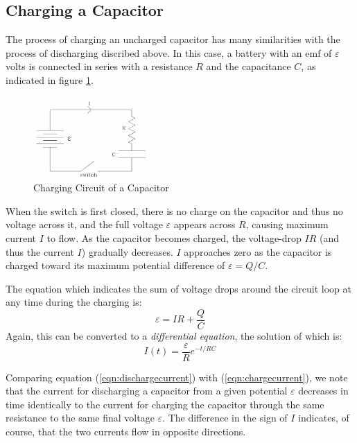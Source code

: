\subsection{Charging a Capacitor}

The process of charging an uncharged capacitor has many similarities with the process of discharging discribed above. In this case, a battery with an emf of $\varepsilon$ volts is connected in series with a resistance $R$ and the capacitance $C$, as indicated in figure \ref{fig:chargecircuit}.

\begin{figure}[h]
    \begin{center}
        \includegraphics[width=0.4\textwidth]{./Exp3/pic/image3.png}
    \end{center}
    \caption{Charging Circuit of a Capacitor}
    \label{fig:chargecircuit}
\end{figure}

When the switch is first closed, there is no charge on the capacitor and thus no voltage across it, and the full voltage $\varepsilon$ appears across $R$, causing maximum current $I$ to flow. As the capacitor becomes charged, the voltage-drop $IR$ (and thus the current $I$) gradually decreases. $I$ approaches zero as the capacitor is charged toward its maximum potential difference of $\varepsilon = Q/C$. \myskip

The equation which indicates the sum of voltage drops around the circuit loop at any time during the charging is:
\begin{equation}
    \varepsilon = IR + \frac{Q}{C}
\end{equation}
Again, this can be converted to a \emph{differential equation}, the solution of which is:
\begin{equation}
    I(t) = \frac{\varepsilon}{R}e^{-t/RC}
    \label{eqn:chargecurrent}
\end{equation}

Comparing equation (\ref{eqn:dischargecurrent}) with (\ref{eqn:chargecurrent}), we note that the current for discharging a capacitor from a given potential $\varepsilon$ decreases in time identically to the current for charging the capacitor through the same resistance to the same final voltage $\varepsilon$. The difference in the sign of $I$ indicates, of course, that the two currents flow in opposite directions.

